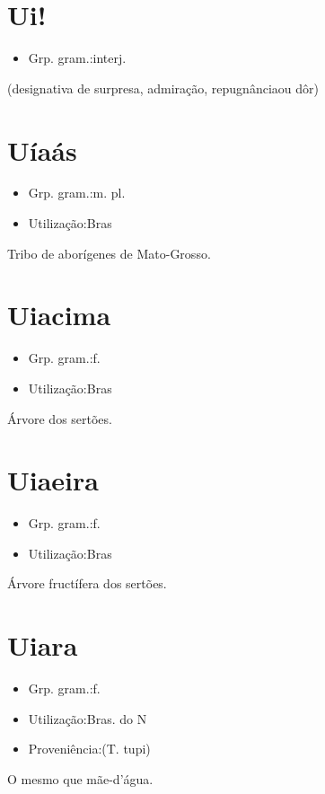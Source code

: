 \documentclass{article}
\begin{document}
\section{Ui!}
\begin{itemize}
\item {Grp. gram.:interj.}
\end{itemize}
(designativa de \textunderscore surpresa\textunderscore , \textunderscore admiração\textunderscore , \textunderscore repugnância\textunderscore  ou \textunderscore dôr\textunderscore )
\section{Uíaás}
\begin{itemize}
\item {Grp. gram.:m. pl.}
\end{itemize}
\begin{itemize}
\item {Utilização:Bras}
\end{itemize}
Tribo de aborígenes de Mato-Grosso.
\section{Uiacima}
\begin{itemize}
\item {Grp. gram.:f.}
\end{itemize}
\begin{itemize}
\item {Utilização:Bras}
\end{itemize}
Árvore dos sertões.
\section{Uiaeira}
\begin{itemize}
\item {Grp. gram.:f.}
\end{itemize}
\begin{itemize}
\item {Utilização:Bras}
\end{itemize}
Árvore fructífera dos sertões.
\section{Uiara}
\begin{itemize}
\item {Grp. gram.:f.}
\end{itemize}
\begin{itemize}
\item {Utilização:Bras. do N}
\end{itemize}
\begin{itemize}
\item {Proveniência:(T. tupi)}
\end{itemize}
O mesmo que \textunderscore mãe-d'água\textunderscore .
\end{document}
